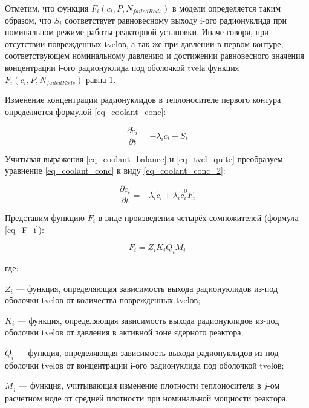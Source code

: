 Отметим, что функция $F_{i}(c_{i}, P, N_{failedRods})$ в модели определяется таким образом, что $S_{i}$ соответствует 
равновесному выходу i-ого радионуклида при номинальном режиме работы реакторной установки. Иначе говоря, при отсутствии 
поврежденных \ac{tvel}ов, а так же при давлении в первом контуре, соответствующем номинальному давлению и достижении 
равновесного значения концентрации i-ого радионуклида под оболочкой \ac{tvel}а функция $F_{i}(c_{i}, P, N_{failedRods})$ 
равна 1.

Изменение концентрации радионуклидов в теплоносителе первого контура определяется формулой \ref{eq_coolant_conc}:

\begin{equation}
    \label{eq_coolant_conc}
    \frac{\partial \widetilde{c}_{i}}{\partial t} = -\lambda_{i}\widetilde{c}_{i} + S_{i}
\end{equation}

Учитывая выражения \ref{eq_coolant_balance} и \ref{eq_tvel_quite} преобразуем уравнение \ref{eq_coolant_conc} к виду 
\ref{eq_coolant_conc_2}:

\begin{equation}
    \label{eq_coolant_conc_2}
    \frac{\partial \widetilde{c}_{i}}{\partial t} = -\lambda_{i}\widetilde{c}_{i} + \lambda_{i}\widetilde{c}_{i}^{0}F_{i}
\end{equation}

Представим функцию $F_{i}$ в виде произведения четырёх сомножителей (формула \ref{eq_F_i}):

\begin{equation}
    \label{eq_F_i}
    F_{i} = Z_{i}K_{i}Q_{i}M_{i}
\end{equation}

где:
\begin{description}
    \item $Z_{i}$ --- функция, определяющая зависимость выхода радионуклидов из-под оболочки \ac{tvel}ов от количества 
        поврежденных \ac{tvel}ов;
    \item $K_{i}$ --- функция, определяющая зависимость выхода радионуклидов из-под оболочки \ac{tvel}ов от давления в 
        активной зоне ядерного реактора;
    \item $Q_{i}$ --- функция, определяющая зависимость выхода радионуклидов из-под оболочки \ac{tvel}ов от концентрации 
        i-ого радионуклида под оболочкой \ac{tvel}ов;
    \item $M_{j}$ --- функция, учитывающая изменение плотности теплоносителя в $j$-ом расчетном ноде от средней 
        плотности при номинальной мощности реактора.
\end{description}

